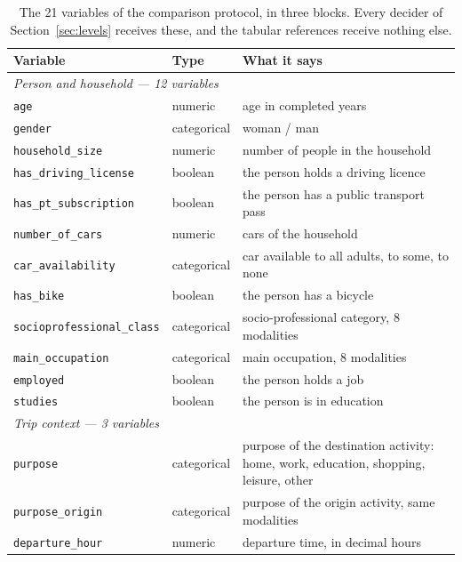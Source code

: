 \begin{table}[tp]
  \caption{The 21 variables of the comparison protocol, in three blocks. Every decider of Section~\ref{sec:levels} receives these, and the tabular references receive nothing else.}
  \label{tab:variables}
  \begin{tabular}{llp{}}
    \toprule
    Variable & Type & What it says \\
    \midrule
    \multicolumn{3}{l}{\textit{Person and household --- 12 variables}} \\
    \texttt{age}                      & numeric     & age in completed years \\
    \texttt{gender}                   & categorical & woman / man \\
    \texttt{household\_size}          & numeric     & number of people in the household \\
    \texttt{has\_driving\_license}    & boolean     & the person holds a driving licence \\
    \texttt{has\_pt\_subscription}    & boolean     & the person has a public transport pass \\
    \texttt{number\_of\_cars}         & numeric     & cars of the household \\
    \texttt{car\_availability}        & categorical & car available to all adults, to some, to none \\
    \texttt{has\_bike}                & boolean     & the person has a bicycle \\
    \texttt{socioprofessional\_class} & categorical & socio-professional category, 8 modalities \\
    \texttt{main\_occupation}         & categorical & main occupation, 8 modalities \\
    \texttt{employed}                 & boolean     & the person holds a job \\
    \texttt{studies}                  & boolean     & the person is in education \\
    \midrule
    \multicolumn{3}{l}{\textit{Trip context --- 3 variables}} \\
    \texttt{purpose}                  & categorical & purpose of the destination activity: home, work, education, shopping, leisure, other \\
    \texttt{purpose\_origin}          & categorical & purpose of the origin activity, same modalities \\
    \texttt{departure\_hour}          & numeric     & departure time, in decimal hours \\

\end{tabular}
\end{table}
